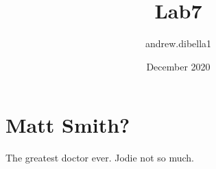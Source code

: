 \documentclass{article}
\title{Lab7}
\author{andrew.dibella1 }
\date{December 2020}
\begin{document}
\maketitle

\section{Matt Smith?}
The greatest doctor ever. Jodie not so much. 
\end{document}
